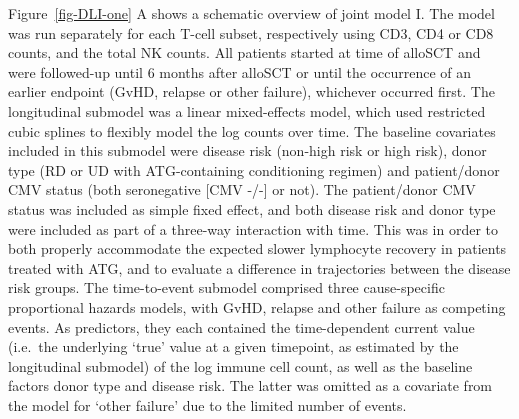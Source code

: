 \documentclass[
  letterpaper,
  DIV=11,
  numbers=noendperiod]{scrreprt}
\begin{document}
Figure~\ref{fig-DLI-one} A shows a schematic overview of joint model I.
The model was run separately for each T-cell subset, respectively using
CD3, CD4 or CD8 counts, and the total NK counts. All patients started at
time of alloSCT and were followed-up until 6 months after alloSCT or
until the occurrence of an earlier endpoint (GvHD, relapse or other
failure), whichever occurred first. The longitudinal submodel was a
linear mixed-effects model, which used restricted cubic splines to
flexibly model the log counts over time. The baseline covariates
included in this submodel were disease risk (non-high risk or high
risk), donor type (RD or UD with ATG-containing conditioning regimen)
and patient/donor CMV status (both seronegative {[}CMV -/-{]} or not).
The patient/donor CMV status was included as simple fixed effect, and
both disease risk and donor type were included as part of a three-way
interaction with time. This was in order to both properly accommodate
the expected slower lymphocyte recovery in patients treated with ATG,
and to evaluate a difference in trajectories between the disease risk
groups. The time-to-event submodel comprised three cause-specific
proportional hazards models, with GvHD, relapse and other failure as
competing events. As predictors, they each contained the time-dependent
current value (i.e.~the underlying `true' value at a given timepoint, as
estimated by the longitudinal submodel) of the log immune cell count, as
well as the baseline factors donor type and disease risk. The latter was
omitted as a covariate from the model for `other failure' due to the
limited number of events.
\end{document}
